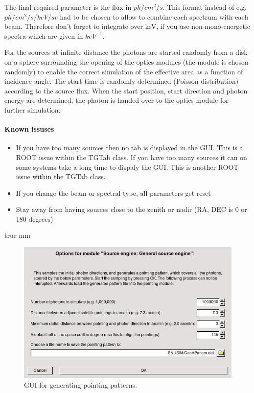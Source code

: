 The final required parameter is the flux in $ph/cm^2/s$. This format instead of e.g. $ph/cm^2/s/keV/sr$ had to be chosen to allow to combine each spectrum with each beam. Therefore don't forget to integrate over keV, if you use non-mono-energetic spectra which are given in $keV^{-1}$.


For the sources at infinite distance the photons are started randomly from a disk on a sphere surrounding the opening of the optics modules (the module is chosen randomly) to enable the correct simulation of the effective area as a function of incidence angle. The start time is randomly determined (Poisson distribution) according to the source flux. When the start position, start direction and photon energy are determined, the photon is handed over to the optics module for further simulation.


\paragraph{Known issuses} 

\begin{itemize}
\item If you have too many sources then no tab is displayed in the GUI. This is a ROOT issue within the TGTab class. If you have too many sources it can on some systems take a long time to dispaly the GUI. This is another ROOT issue within the TGTab class.
\item If you change the beam or spectral type, all parameters get reset
\item Stay away from having sources close to the zenith or nadir (RA, DEC is 0 or 180 degrees) 
\end{itemize}

 true mm

\begin{figure}[tb]
\begin{center}
\includegraphics[scale=0.5]{images/pointingpatternGUI.png}  
\caption{GUI for generating pointing patterns.}
\label{pointingpatterngui} 
\end{center}
\end{figure}

